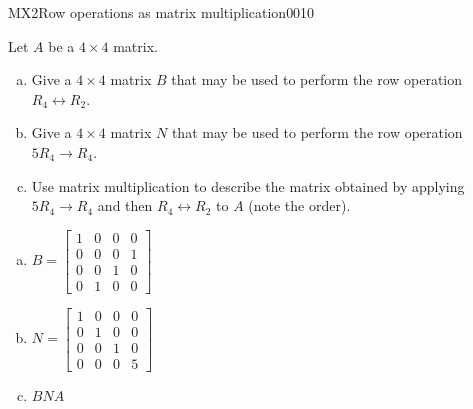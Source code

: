 \begin{exercise}{MX2}{Row operations as matrix multiplication}{0010} 
\begin{exerciseStatement} 

Let \(A\) be a \(4 \times 4\) matrix.

 

\begin{enumerate}[(a)]
\item Give a \(4 \times 4\) matrix \(B\) that may be used to perform the row operation \(R_4 \leftrightarrow R_2\).
\item Give a \(4 \times 4\) matrix \(N\) that may be used to perform the row operation \(5 R_4 \to R_4\).
\item Use matrix multiplication to describe the matrix obtained by applying \(5 R_4 \to R_4\) and then \(R_4 \leftrightarrow R_2\) to \(A\) (note the order). 
\end{enumerate}

     \end{exerciseStatement}
 \begin{exerciseAnswer} 

\begin{enumerate}[(a)]
\item \(B=\left[\begin{array}{cccc}
1 & 0 & 0 & 0 \\
0 & 0 & 0 & 1 \\
0 & 0 & 1 & 0 \\
0 & 1 & 0 & 0
\end{array}\right]\)
\item \(N=\left[\begin{array}{cccc}
1 & 0 & 0 & 0 \\
0 & 1 & 0 & 0 \\
0 & 0 & 1 & 0 \\
0 & 0 & 0 & 5
\end{array}\right]\)
\item  \(BNA\) 
\end{enumerate}

     \end{exerciseAnswer}
 \end{exercise}



